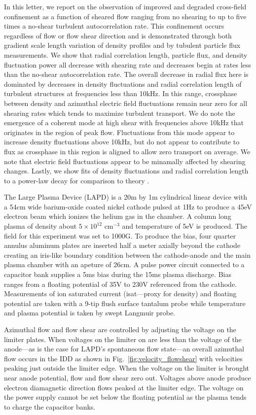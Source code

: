 \documentclass[%
 aps,
 prl,
 amsmath,amssymb,
 reprint,%
]{revtex4-1}
\begin{document}
In this letter, we report on the observation of improved and degraded cross-field confinement as a function of sheared flow ranging from no shearing to up to five times a no-shear turbulent autocorrelation rate. This confinement occurs regardless of flow or flow shear direction and is demonstrated through both gradient scale length variation of density profiles and by tubulent particle flux measurements. We show that radial correlation length, particle flux, and density fluctuation power all decrease with shearing rate and decreases begin at rates less than the no-shear autocorrelation rate. The overall decrease in radial flux here is dominated by decreases in density fluctuations and radial correlation length of turbulent structures at frequencies less than 10kHz. In this range, crossphase between density and azimuthal electric field fluctuations remain near zero for all shearing rates which tends to maximize turbulent transport. We do note the emergence of a coherent mode at high shear with frequencies above 10kHz that originates in the region of peak flow. Fluctuations from this mode appear to increase density fluctuations above 10kHz, but do not appear to contribute to flux as crossphase in this region is aligned to allow zero transport on average. We note that electric field fluctuations appear to be minamally affected by shearing changes. Lastly, we show fits of density fluctuations and radial correlation length to a power-law decay for comparison to theory \cite{biglari90}.

The Large Plasma Device \cite{gek91} (LAPD) is a 20m by 1m cylindrical linear device with a 54cm wide barium-oxide coated nickel cathode pulsed at 1Hz to produce a 45eV electron beam which ionizes the helium gas in the chamber. A column long plasma of density about $5 \times 10^{12}$ cm$^{-3}$ and temperature of 5eV is produced. The field for this experiment was set to 1000G. To produce the bias, four quarter annulus aluminum plates are inserted half a meter axially beyond the cathode creating an iris-like boundary condition between the cathode-anode and the main plasma chamber with an apeture of 26cm. A pulse power circuit connected to a capacitor bank supplies a 5ms bias during the 15ms plasma discharge. Bias ranges from a floating potential of 35V to 230V referenced from the cathode. Measurements of ion saturated current (isat---proxy for density) and floating potential are taken with a 9-tip flush surface tantalum probe while temperature and plasma potential is taken by swept Langmuir probe.

Azimuthal flow and flow shear are controlled by adjusting the voltage on the limiter plates. When voltages on the limiter on are less than the voltage of the anode---as is the case for LAPD's spontaneous flow state---an overall azimuthal flow occurs in the IDD as shown in Fig.~\ref{fig:velocity_flowshear} with velocities peaking just outside the limiter edge. When the voltage on the limiter is brought near anode potential, flow and flow shear zero out. Voltages above anode produce electron diamagnetic direction flows peaked at the limiter edge. The voltage on the power supply cannot be set below the floating potential as the plasma tends to charge the capacitor banks.
\end{document}
